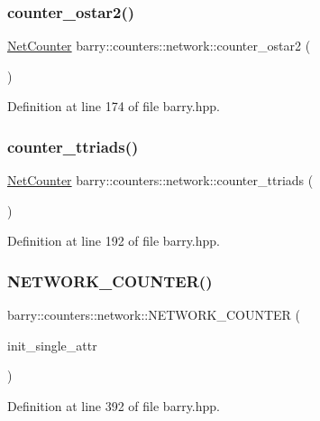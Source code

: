 \subsubsection{\texorpdfstring{counter\+\_\+ostar2()}{counter\_ostar2()}}
{\footnotesize\ttfamily \hyperlink{namespacebarry_1_1counters_1_1network_a067bd9de04608fc2e1586324d3864a45}{Net\+Counter} barry\+::counters\+::network\+::counter\+\_\+ostar2 (\begin{DoxyParamCaption}{ }\end{DoxyParamCaption})\hspace{0.3cm}{\ttfamily [inline]}}



Definition at line 174 of file barry.\+hpp.

\mbox{\label{namespacebarry_1_1counters_1_1network_a1e21fb2e0400c8644da1333337c3699a}} 
\subsubsection{\texorpdfstring{counter\+\_\+ttriads()}{counter\_ttriads()}}
{\footnotesize\ttfamily \hyperlink{namespacebarry_1_1counters_1_1network_a067bd9de04608fc2e1586324d3864a45}{Net\+Counter} barry\+::counters\+::network\+::counter\+\_\+ttriads (\begin{DoxyParamCaption}{ }\end{DoxyParamCaption})\hspace{0.3cm}{\ttfamily [inline]}}



Definition at line 192 of file barry.\+hpp.

\mbox{\label{namespacebarry_1_1counters_1_1network_a7649cd035af193258a69058aea425941}} 
\subsubsection{\texorpdfstring{N\+E\+T\+W\+O\+R\+K\+\_\+\+C\+O\+U\+N\+T\+E\+R()}{NETWORK\_COUNTER()}}
{\footnotesize\ttfamily barry\+::counters\+::network\+::\+N\+E\+T\+W\+O\+R\+K\+\_\+\+C\+O\+U\+N\+T\+ER (\begin{DoxyParamCaption}\item[{init\+\_\+single\+\_\+attr}]{ }\end{DoxyParamCaption})}



Definition at line 392 of file barry.\+hpp.

